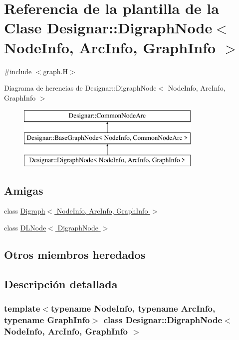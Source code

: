 \hypertarget{class_designar_1_1_digraph_node}{}\section{Referencia de la plantilla de la Clase Designar\+:\+:Digraph\+Node$<$ Node\+Info, Arc\+Info, Graph\+Info $>$}
\label{class_designar_1_1_digraph_node}


{\ttfamily \#include $<$graph.\+H$>$}

Diagrama de herencias de Designar\+:\+:Digraph\+Node$<$ Node\+Info, Arc\+Info, Graph\+Info $>$\begin{figure}[H]
\begin{center}
\leavevmode
\includegraphics[height=3.000000cm]{class_designar_1_1_digraph_node}
\end{center}
\end{figure}
\subsection*{Amigas}
\begin{DoxyCompactItemize}
\item 
class \hyperlink{class_designar_1_1_digraph_node_abc8f370e4ec7084a6574cf967a5a5aaf}{Digraph$<$ Node\+Info, Arc\+Info, Graph\+Info $>$}
\item 
class \hyperlink{class_designar_1_1_digraph_node_a5532eb461a543edfe19acf97b74316fc}{D\+L\+Node$<$ Digraph\+Node $>$}
\end{DoxyCompactItemize}
\subsection*{Otros miembros heredados}


\subsection{Descripción detallada}
\subsubsection*{template$<$typename Node\+Info, typename Arc\+Info, typename Graph\+Info$>$\newline
class Designar\+::\+Digraph\+Node$<$ Node\+Info, Arc\+Info, Graph\+Info $>$}



